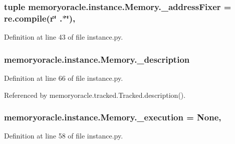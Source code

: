 \subsubsection[{\+\_\+address\+Fixer}]{\setlength{\rightskip}{0pt plus 5cm}tuple memoryoracle.\+instance.\+Memory.\+\_\+address\+Fixer = re.\+compile(r\char`\"{} .$\ast$\char`\"{})\hspace{0.3cm}{\ttfamily [static]}, {\ttfamily [private]}}\label{classmemoryoracle_1_1instance_1_1Memory_a95ef257acf3cfaa88c9b00ab11256a64}


Definition at line 43 of file instance.\+py.

\hypertarget{classmemoryoracle_1_1instance_1_1Memory_a788ea83ee6828d6bc864acb07862d920}{}
\subsubsection[{\+\_\+description}]{\setlength{\rightskip}{0pt plus 5cm}memoryoracle.\+instance.\+Memory.\+\_\+description\hspace{0.3cm}{\ttfamily [private]}}\label{classmemoryoracle_1_1instance_1_1Memory_a788ea83ee6828d6bc864acb07862d920}


Definition at line 66 of file instance.\+py.



Referenced by memoryoracle.\+tracked.\+Tracked.\+description().

\hypertarget{classmemoryoracle_1_1instance_1_1Memory_a3919dc8184d2d87a2cf0fcd3f7c6b824}{}
\subsubsection[{\+\_\+execution}]{\setlength{\rightskip}{0pt plus 5cm}memoryoracle.\+instance.\+Memory.\+\_\+execution = None\hspace{0.3cm}{\ttfamily [static]}, {\ttfamily [private]}}\label{classmemoryoracle_1_1instance_1_1Memory_a3919dc8184d2d87a2cf0fcd3f7c6b824}


Definition at line 58 of file instance.\+py.

